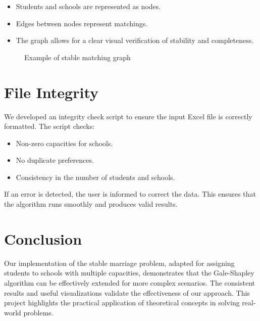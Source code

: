 \documentclass{article}
\begin{document}
\begin{itemize}
    \item Students and schools are represented as nodes.
    \item Edges between nodes represent matchings.
    \item The graph allows for a clear visual verification of stability and completeness.
\end{itemize}

\begin{figure}[h]
    \centering
    \caption{Example of stable matching graph}
    \label{fig:result_graph}
\end{figure}

\section{File Integrity}
We developed an integrity check script to ensure the input Excel file is correctly formatted. The script checks:

\begin{itemize}
    \item Non-zero capacities for schools.
    \item No duplicate preferences.
    \item Consistency in the number of students and schools.
\end{itemize}

If an error is detected, the user is informed to correct the data. This ensures that the algorithm runs smoothly and produces valid results.

\section{Conclusion}
Our implementation of the stable marriage problem, adapted for assigning students to schools with multiple capacities, demonstrates that the Gale-Shapley algorithm can be effectively extended for more complex scenarios. The consistent results and useful visualizations validate the effectiveness of our approach. This project highlights the practical application of theoretical concepts in solving real-world problems.
\end{document}
